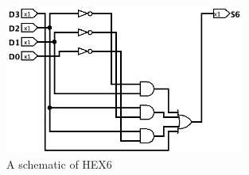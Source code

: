 \documentclass{article}
\begin{document}
\begin{enumerate}
\begin{figure}[ht!]
    \centering
    \includegraphics[width=0.7\textwidth]{part2_hex6.png}
    \caption{A schematic of HEX6}
    \label{f:part2_hex6}
\end{figure}

\end{enumerate}
\end{document}
